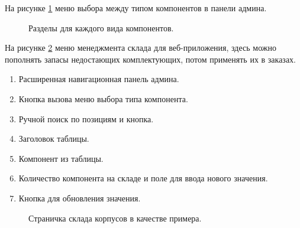 На рисунке \ref{razdeli:image} меню выбора между типом компонентов в панели админа.

\begin{figure}[htbp]
\caption{Разделы для каждого вида компонентов.}
\label{razdeli:image}
\end{figure}

На рисунке \ref{storedf:image} меню менеджмента склада для веб-приложения, здесь можно пополнять запасы недостающих комплектующих, потом применять их в заказах.

\begin{enumerate}
	\item Расширенная навигационная панель админа.
	\item Кнопка вызова меню выбора типа компонента.
	\item Ручной поиск по позициям и кнопка.
	\item Заголовок таблицы.
	\item Компонент из таблицы.
	\item Количество компонента на складе и поле для ввода нового значения.
	\item Кнопка для обновления значения.
\end{enumerate}

\begin{figure}[ht]
	\caption{Страничка склада корпусов в качестве примера.}
	\label{storedf:image}
\end{figure}
\clearpage
